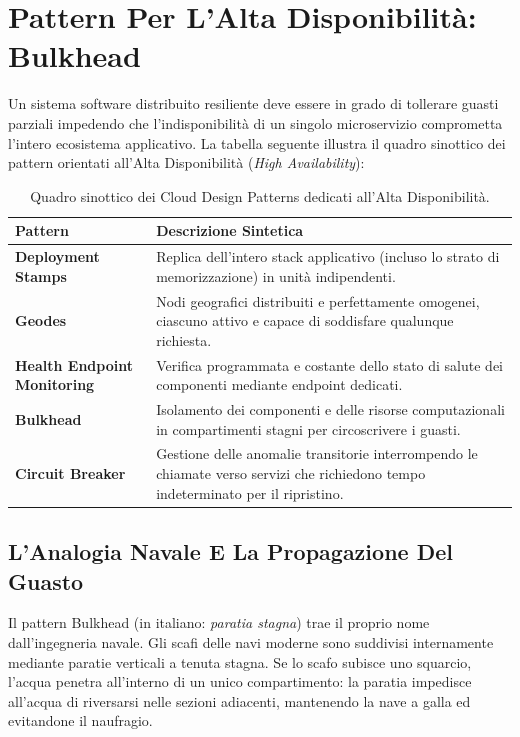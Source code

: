 \documentclass[11pt, a4paper]{article}
\begin{document}
\newpage

\section{Pattern Per L'Alta Disponibilità: Bulkhead}

Un sistema software distribuito resiliente deve essere in grado di tollerare guasti parziali impedendo che l'indisponibilità di un singolo microservizio comprometta l'intero ecosistema applicativo. La tabella seguente illustra il quadro sinottico dei pattern orientati all'Alta Disponibilità (\emph{High Availability}):

\begin{table}[H]
\centering
\small
\begin{tabularx}{\textwidth}{lX}
\toprule
\textbf{Pattern} & \textbf{Descrizione Sintetica} \\
\midrule
\textbf{Deployment Stamps} & Replica dell'intero stack applicativo (incluso lo strato di memorizzazione) in unità indipendenti. \\
\textbf{Geodes} & Nodi geografici distribuiti e perfettamente omogenei, ciascuno attivo e capace di soddisfare qualunque richiesta. \\
\textbf{Health Endpoint Monitoring} & Verifica programmata e costante dello stato di salute dei componenti mediante endpoint dedicati. \\
\textbf{Bulkhead} & Isolamento dei componenti e delle risorse computazionali in compartimenti stagni per circoscrivere i guasti. \\
\textbf{Circuit Breaker} & Gestione delle anomalie transitorie interrompendo le chiamate verso servizi che richiedono tempo indeterminato per il ripristino. \\
\bottomrule
\end{tabularx}
\caption{Quadro sinottico dei Cloud Design Patterns dedicati all'Alta Disponibilità.}
\label{tab:ha_patterns}
\end{table}

\subsection{L'Analogia Navale E La Propagazione Del Guasto}

Il pattern Bulkhead (in italiano: \emph{paratia stagna}) trae il proprio nome dall'ingegneria navale. Gli scafi delle navi moderne sono suddivisi internamente mediante paratie verticali a tenuta stagna. Se lo scafo subisce uno squarcio, l'acqua penetra all'interno di un unico compartimento: la paratia impedisce all'acqua di riversarsi nelle sezioni adiacenti, mantenendo la nave a galla ed evitandone il naufragio.
\end{document}
